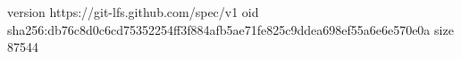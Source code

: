 version https://git-lfs.github.com/spec/v1
oid sha256:db76c8d0c6cd75352254ff3f884afb5ae71fe825c9ddea698ef55a6e6e570e0a
size 87544
